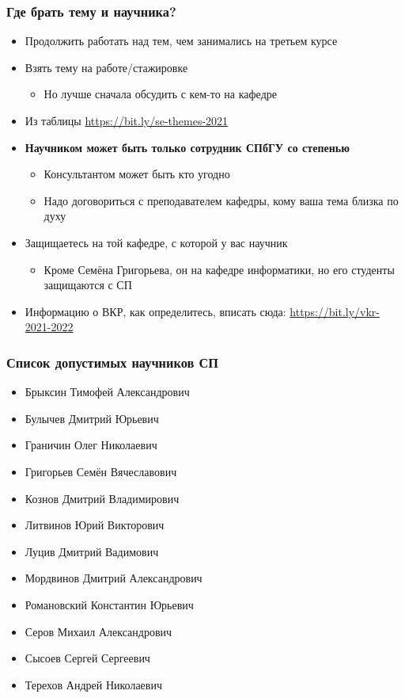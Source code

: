 \documentclass[xetex,mathserif,serif]{beamer}
\begin{document}
    \begin{frame}
        \frametitle{Где брать тему и научника?}
        \begin{itemize}
            \item Продолжить работать над тем, чем занимались на третьем курсе
            \item Взять тему на работе/стажировке
            \begin{itemize}
                \item Но лучше сначала обсудить с кем-то на кафедре
            \end{itemize}
            \item Из таблицы \url{https://bit.ly/se-themes-2021}
            \item \textbf{Научником может быть только сотрудник СПбГУ со степенью}
            \begin{itemize}
                \item Консультантом может быть кто угодно
                \item Надо договориться с преподавателем кафедры, кому ваша тема близка по духу
            \end{itemize}
            \item Защищаетесь на той кафедре, с которой у вас научник
            \begin{itemize}
                \item Кроме Семёна Григорьева, он на кафедре информатики, но его студенты защищаются с СП
            \end{itemize}
            \item Информацию о ВКР, как определитесь, вписать сюда: \url{https://bit.ly/vkr-2021-2022}
        \end{itemize}
    \end{frame}

    \begin{frame}
        \frametitle{Список допустимых научников СП}
        \begin{itemize}
            \item Брыксин Тимофей Александрович
            \item Булычев Дмитрий Юрьевич
            \item Граничин Олег Николаевич
            \item Григорьев Семён Вячеславович
            \item Кознов Дмитрий Владимирович
            \item Литвинов Юрий Викторович
            \item Луцив Дмитрий Вадимович
            \item Мордвинов Дмитрий Александрович
            \item Романовский Константин Юрьевич
            \item Серов Михаил Александрович
            \item Сысоев Сергей Сергеевич
            \item Терехов Андрей Николаевич
        \end{itemize}
    \end{frame}
\end{document}
